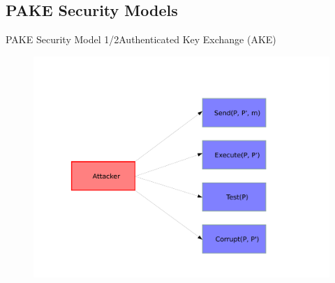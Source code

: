 \documentclass[notes,xcolor=dvipsnames]{beamer}
\begin{document}
\subsection{PAKE Security Models}

\begin{frame}{PAKE Security Model 1/2}{Authenticated Key Exchange (AKE)}
  \begin{figure}
  \centering
  \includegraphics[width=\textwidth]{pakeGame.pdf}
  \end{figure}
\end{frame}
\end{document}
